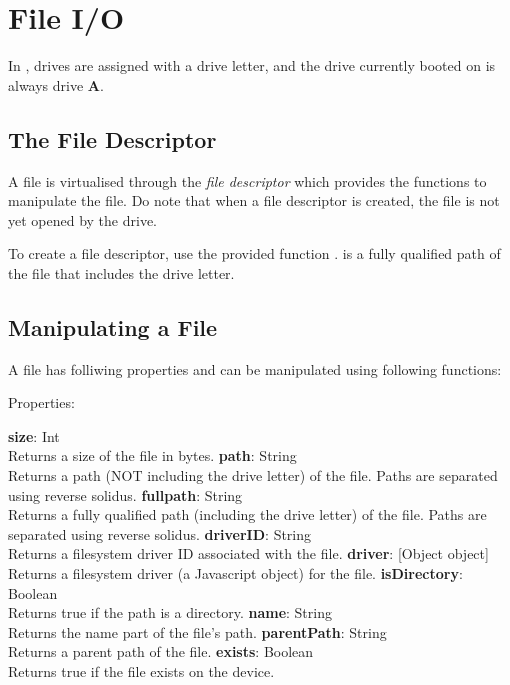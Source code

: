 \chapter{File I/O}
In \thedos, drives are assigned with a drive letter, and the drive currently booted on is always drive \textbf{A}.


\section{The File Descriptor}
A file is virtualised through the \emph{file descriptor} which provides the functions to manipulate the file. Do note that when a file descriptor is created, the file is not yet opened by the drive.

To create a file descriptor, use the provided function .  is a fully qualified path of the file that includes the drive letter.

\section{Manipulating a File}
A file has folliwing properties and can be manipulated using following functions:

Properties:

\begin{outline}
\1\textbf{size}: Int
\\Returns a size of the file in bytes.
\1\textbf{path}: String
\\Returns a path (NOT including the drive letter) of the file. Paths are separated using reverse solidus.
\1\textbf{fullpath}: String
\\Returns a fully qualified path (including the drive letter) of the file. Paths are separated using reverse solidus.
\1\textbf{driverID}: String
\\Returns a filesystem driver ID associated with the file.
\1\textbf{driver}: [Object object]
\\Returns a filesystem driver (a Javascript object) for the file.
\1\textbf{isDirectory}: Boolean
\\Returns true if the path is a directory.
\1\textbf{name}: String
\\Returns the name part of the file's path.
\1\textbf{parentPath}: String
\\Returns a parent path of the file.
\1\textbf{exists}: Boolean
\\Returns true if the file exists on the device.
\end{outline}

